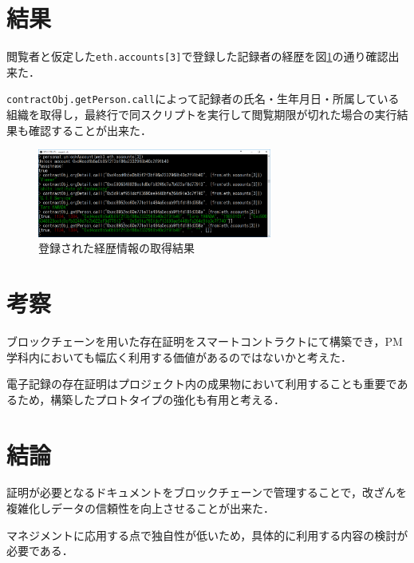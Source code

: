 \documentclass[uplatex,twocolumn,dvipdfmx]{jsarticle}
\begin{document}
\section{結果}

閲覧者と仮定した\verb|eth.accounts[3]|で登録した記録者の経歴を図\ref{code}の通り確認出来た．

\verb|contractObj.getPerson.call|によって記録者の氏名・生年月日・所属している組織を取得し，最終行で同スクリプトを実行して閲覧期限が切れた場合の実行結果も確認することが出来た．

\begin{figure}[htb]
\centering
\includegraphics[width=7.7cm,clip]{code.png}
\caption{登録された経歴情報の取得結果}\label{code}
\end{figure}

\section{考察}

ブロックチェーンを用いた存在証明をスマートコントラクトにて構築でき，PM学科内においても幅広く利用する価値があるのではないかと考えた．

電子記録の存在証明はプロジェクト内の成果物において利用することも重要であるため，構築したプロトタイプの強化も有用と考える．

\section{結論}

証明が必要となるドキュメントをブロックチェーンで管理することで，改ざんを複雑化しデータの信頼性を向上させることが出来た．

マネジメントに応用する点で独自性が低いため，具体的に利用する内容の検討が必要である．


\end{document}
